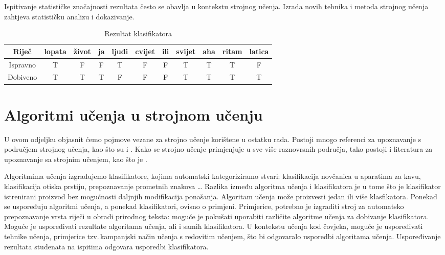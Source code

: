 Ispitivanje statističke značajnosti rezultata često se obavlja u kontekstu strojnog učenja. Izrada novih tehnika i metoda strojnog učenja zahtjeva statističku analizu i dokazivanje. 

\begin{table}
\centering
\begin{tabular}{|c||c|c|c|c|c|c|c|c|c|c|}
\hline
Riječ & lopata & život & ja & ljudi & cvijet & ili & svijet & aha & ritam & latica \\ \hline
Ispravno & T & F & F & T & F & F & T & T & T & F \\ \hline
Dobiveno & T & T & T & F & F & F & T & T & T & T \\ \hline
\end{tabular}
\caption{Rezultat klasifikatora}
\label{tab:usporedba_predict_gold}
\end{table}

\section{Algoritmi učenja u strojnom učenju}

U ovom odjeljku objasnit ćemo pojmove vezane za strojno učenje korištene u ostatku rada. Postoji mnogo referenci za upoznavanje s područjem strojnog učenja, kao što su \citep{anderson1986machine} i \citep{bishop2006pattern}. Kako se strojno učenje primjenjuje u sve više raznovrsnih područja, tako postoji i literatura za upoznavanje sa strojnim učenjem, kao što je \citep{baldi2001bioinformatics}. 

Algoritmima učenja izgrađujemo klasifikatore, kojima automatski kategoriziramo stvari: klasifikacija novčanica u aparatima za kavu, klasifikacija otiska prstiju, prepoznavanje prometnih znakova \dots
Razlika između algoritma učenja i klasifikatora je u tome što je klasifikator istrenirani proizvod bez mogućnosti daljnjih modifikacija ponašanja. Algoritam učenja može proizvesti jedan ili više klasfikatora. Ponekad se uspoređuju algoritmi učenja, a ponekad klasifikatori, ovisno o primjeni. Primjerice, potrebno je izgraditi stroj za automatsko prepoznavanje vrsta riječi u obradi prirodnog teksta: moguće je pokušati uporabiti različite algoritme učenja za dobivanje klasifikatora. Moguće je uspoređivati rezultate algoritama učenja, ali i samih klasifikatora. U kontekstu učenja kod čovjeka, moguće je uspoređivati tehnike učenja, primjerice tzv.\,kampanjski način učenja s redovitim učenjem, što bi odgovaralo usporedbi algoritama učenja. Uspoređivanje rezultata studenata na ispitima odgovara usporedbi klasifikatora.

